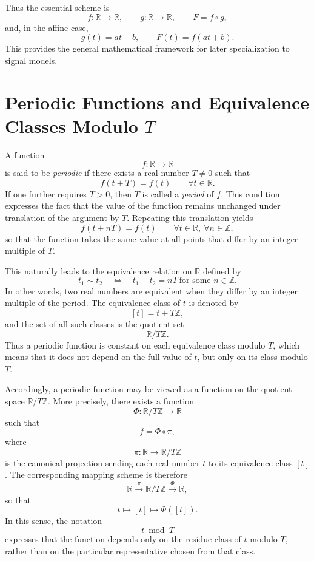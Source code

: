 \documentclass{article}
\begin{document}
	Thus the essential scheme is
	\[
	f:\mathbb{R}\to\mathbb{R},\qquad g:\mathbb{R}\to\mathbb{R},\qquad F=f\circ g,
	\]
	and, in the affine case,
	\[
	g(t)=at+b,\qquad F(t)=f(at+b).
	\]
	This provides the general mathematical framework for later specialization to signal models.
	
	\section*{Periodic Functions and Equivalence Classes Modulo \(T\)}
	
	A function
	\[
	f:\mathbb{R}\to\mathbb{R}
	\]
	is said to be \emph{periodic} if there exists a real number \(T\neq 0\) such that
	\[
	f(t+T)=f(t)\qquad \forall t\in\mathbb{R}.
	\]
	If one further requires \(T>0\), then \(T\) is called a \emph{period} of \(f\). This condition expresses the fact that the value of the function remains unchanged under translation of the argument by \(T\). Repeating this translation yields
	\[
	f(t+nT)=f(t)\qquad \forall t\in\mathbb{R},\ \forall n\in\mathbb{Z},
	\]
	so that the function takes the same value at all points that differ by an integer multiple of \(T\).
	
	This naturally leads to the equivalence relation on \(\mathbb{R}\) defined by
	\[
	t_1\sim t_2
	\quad\Longleftrightarrow\quad
	t_1-t_2=nT
	\ \text{for some } n\in\mathbb{Z}.
	\]
	In other words, two real numbers are equivalent when they differ by an integer multiple of the period. The equivalence class of \(t\) is denoted by
	\[
	[t]=t+T\mathbb{Z},
	\]
	and the set of all such classes is the quotient set
	\[
	\mathbb{R}/T\mathbb{Z}.
	\]
	Thus a periodic function is constant on each equivalence class modulo \(T\), which means that it does not depend on the full value of \(t\), but only on its class modulo \(T\).
	
	Accordingly, a periodic function may be viewed as a function on the quotient space \(\mathbb{R}/T\mathbb{Z}\). More precisely, there exists a function
	\[
	\Phi:\mathbb{R}/T\mathbb{Z}\to\mathbb{R}
	\]
	such that
	\[
	f=\Phi\circ\pi,
	\]
	where
	\[
	\pi:\mathbb{R}\to\mathbb{R}/T\mathbb{Z}
	\]
	is the canonical projection sending each real number \(t\) to its equivalence class \([t]\). The corresponding mapping scheme is therefore
	\[
	\mathbb{R}\xrightarrow{\;\pi\;}\mathbb{R}/T\mathbb{Z}\xrightarrow{\;\Phi\;}\mathbb{R},
	\]
	so that
	\[
	t\longmapsto [t]\longmapsto \Phi([t]).
	\]
	In this sense, the notation
	\[
	t \bmod T
	\]
	expresses that the function depends only on the residue class of \(t\) modulo \(T\), rather than on the particular representative chosen from that class.
	
\end{document}
